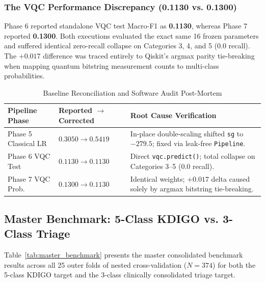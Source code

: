 \documentclass[conference]{IEEEtran}
\begin{document}
\subsubsection{The VQC Performance Discrepancy (0.1130 vs. 0.1300)}
Phase 6 reported standalone VQC test Macro-F1 as \textbf{0.1130}, whereas Phase 7 reported \textbf{0.1300}. Both executions evaluated the exact same 16 frozen parameters and suffered identical zero-recall collapse on Categories 3, 4, and 5 (0.0 recall). The $+0.017$ difference was traced entirely to Qiskit's argmax parity tie-breaking when mapping quantum bitstring measurement counts to multi-class probabilities.

\begin{table}[htbp]
\centering
\caption{Baseline Reconciliation and Software Audit Post-Mortem}
\label{tab:bug_reconciliation}
\renewcommand{\arraystretch}{1.15}
\begin{tabularx}{\columnwidth}{lXX}
\toprule
\textbf{Pipeline Phase} & \textbf{Reported $\to$ Corrected} & \textbf{Root Cause Verification} \\
\midrule
Phase 5 Classical LR & $0.3050 \to \mathbf{0.5419}$ & In-place double-scaling shifted \texttt{sg} to $-279.5$; fixed via leak-free \texttt{Pipeline}. \\
Phase 6 VQC Test & $0.1130 \to \mathbf{0.1130}$ & Direct \texttt{vqc.predict()}; total collapse on Categories 3--5 (0.0 recall). \\
Phase 7 VQC Prob. & $0.1300 \to \mathbf{0.1130}$ & Identical weights; $+0.017$ delta caused solely by argmax bitstring tie-breaking. \\
\bottomrule
\end{tabularx}
\end{table}

\subsection{Master Benchmark: 5-Class KDIGO vs. 3-Class Triage}
Table~\ref{tab:master_benchmark} presents the master consolidated benchmark results across all 25 outer folds of nested cross-validation ($N = 374$) for both the 5-class KDIGO target and the 3-class clinically consolidated triage target.
\end{document}
